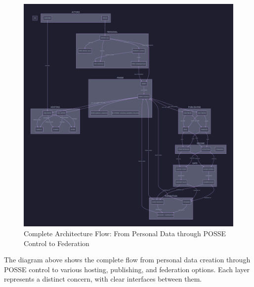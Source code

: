 \documentclass[11pt]{article}
\begin{document}
\begin{figure}[h]
    \centering
    \includegraphics[width=\textwidth]{out/architecture_v2.pdf}
    \caption{Complete Architecture Flow: From Personal Data through POSSE Control to Federation}
    \label{fig:architecture}
\end{figure}

The diagram above shows the complete flow from personal data creation through POSSE control to various hosting, publishing, and federation options. Each layer represents a distinct concern, with clear interfaces between them.
\end{document}
